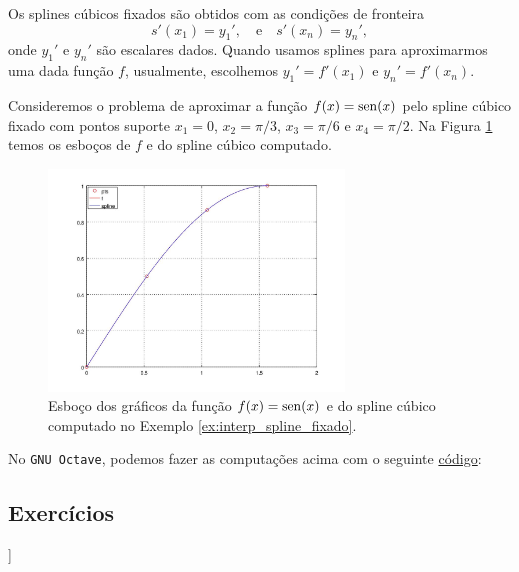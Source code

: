 Os splines cúbicos fixados são obtidos com as condições de fronteira
\begin{equation}
  s'(x_1)=y_1',\quad\text{e}\quad s'(x_n)=y_n',
\end{equation}
onde $y_1'$ e $y_n'$ são escalares dados. Quando usamos splines para aproximarmos uma dada função $f$, usualmente, escolhemos $y_1'=f'(x_1)$ e $y_n'=f'(x_n)$.

\begin{ex}\label{ex:interp_spline_fixado}
  Consideremos o problema de aproximar a função $f(x)=\operatorname{sen}(x)$ pelo spline cúbico fixado com pontos suporte $x_1=0$, $x_2=\pi/3$, $x_3=\pi/6$ e $x_4=\pi/2$. Na Figura \ref{fig:interp_spline_fixado} temos os esboços de $f$ e do spline cúbico computado.

  \begin{figure}[h!]
    \centering
    \includegraphics[width=0.7\textwidth]{./cap_interp/dados/ex_interp_spline_fixado/fig_interp_spline_fixado}
    \caption{Esboço dos gráficos da função $f(x)=\operatorname{sen}(x)$ e do spline cúbico computado no Exemplo \ref{ex:interp_spline_fixado}.}
    \label{fig:interp_spline_fixado}
  \end{figure}

\ifisoctave
No \verb+GNU Octave+, podemos fazer as computações acima com o seguinte \href{https://github.com/phkonzen/notas/blob/master/src/MatematicaNumerica/cap_interp/dados/ex_interp_spline_fixado/ex_interp_spline_fixado.m}{código}:

\fi
\end{ex}

\subsection*{Exercícios}

\begin{flushleft}
  [[tag:construcao]]
\end{flushleft}

